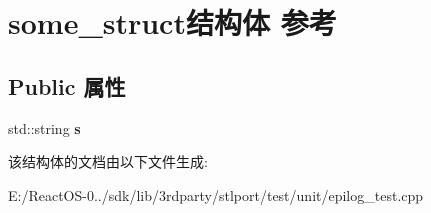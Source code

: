 \hypertarget{structsome__struct}{}\section{some\+\_\+struct结构体 参考}
\label{structsome__struct}
\subsection*{Public 属性}
\begin{DoxyCompactItemize}
\item 
\mbox{\label{structsome__struct_aa9eeca281a61e249a6ee0a6bd6a0ffbd}} 
std\+::string {\bfseries s}
\end{DoxyCompactItemize}


该结构体的文档由以下文件生成\+:\begin{DoxyCompactItemize}
\item 
E\+:/\+React\+O\+S-\/0../sdk/lib/3rdparty/stlport/test/unit/epilog\+\_\+test.\+cpp\end{DoxyCompactItemize}
